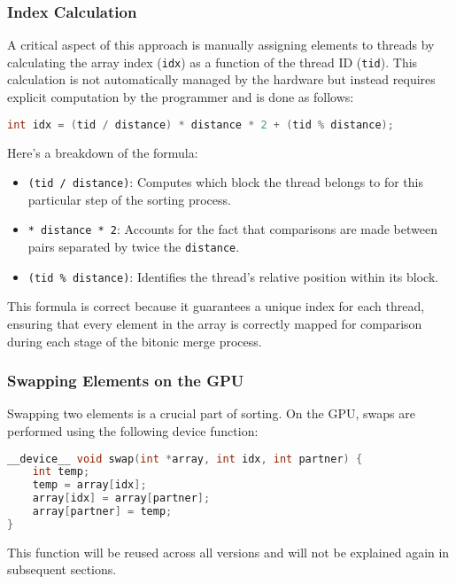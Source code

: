 \documentclass[a4paper,12pt]{article}
\begin{document}
\subsubsection*{Index Calculation}

A critical aspect of this approach is manually assigning elements to threads by calculating the array index (\texttt{idx}) as a function of the thread ID (\texttt{tid}). This calculation is not automatically managed by the hardware but instead requires explicit computation by the programmer and is done as follows:

\begin{lstlisting}[language=C]
int idx = (tid / distance) * distance * 2 + (tid % distance);
\end{lstlisting}

Here's a breakdown of the formula:
\begin{itemize}
    \item \texttt{(tid / distance)}: Computes which block the thread belongs to for this particular step of the sorting process.
    \item \texttt{* distance * 2}: Accounts for the fact that comparisons are made between pairs separated by twice the \texttt{distance}.
    \item \texttt{(tid \% distance)}: Identifies the thread’s relative position within its block.
\end{itemize}

This formula is correct because it guarantees a unique index for each thread, ensuring that every element in the array is correctly mapped for comparison during each stage of the bitonic merge process.

\subsubsection*{Swapping Elements on the GPU}

Swapping two elements is a crucial part of sorting. On the GPU, swaps are performed using the following device function:

\begin{lstlisting}[language=C]
__device__ void swap(int *array, int idx, int partner) {
    int temp;
    temp = array[idx];
    array[idx] = array[partner];
    array[partner] = temp;
}
\end{lstlisting}

This function will be reused across all versions and will not be explained again in subsequent sections.
\end{document}
